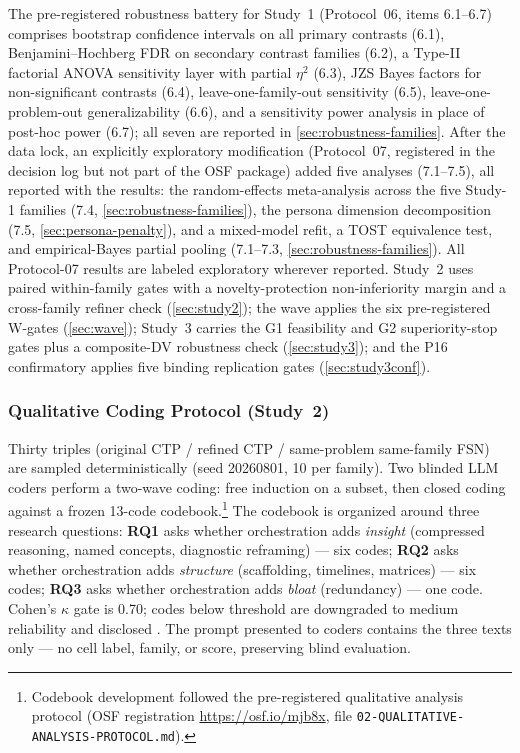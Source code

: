 \documentclass[12pt,a4paper]{article}
\begin{document}
The pre-registered robustness battery for Study~1 (Protocol~06,
items 6.1--6.7) comprises
bootstrap confidence intervals on all primary contrasts (6.1),
Benjamini--Hochberg FDR on secondary contrast families (6.2), a Type-II
factorial ANOVA sensitivity layer with partial $\eta^2$ (6.3), JZS Bayes
factors for non-significant contrasts (6.4), leave-one-family-out
sensitivity (6.5), leave-one-problem-out generalizability (6.6), and a
sensitivity power analysis in place of post-hoc power (6.7); all seven are
reported in \cref{sec:robustness-families}. After the data
lock, an explicitly exploratory modification (Protocol~07, registered in the
decision log but not part of the OSF package) added five analyses
(7.1--7.5), all reported with the results: the random-effects meta-analysis
across the five Study-1 families (7.4, \cref{sec:robustness-families}), the
persona dimension decomposition (7.5, \cref{sec:persona-penalty}), and a
mixed-model refit, a TOST equivalence test, and empirical-Bayes partial
pooling (7.1--7.3, \cref{sec:robustness-families}). All Protocol-07 results
are labeled exploratory wherever reported. Study~2 uses paired within-family
gates with a novelty-protection non-inferiority margin and a cross-family
refiner check (\cref{sec:study2}); the wave applies the six pre-registered
W-gates (\cref{sec:wave}); Study~3 carries the G1 feasibility and G2
superiority-stop gates plus a composite-DV robustness check
(\cref{sec:study3}); and the P16 confirmatory applies five binding
replication gates (\cref{sec:study3conf}).

\subsubsection{Qualitative Coding Protocol (Study~2)}\label{sec:qual-coding}

Thirty triples (original CTP / refined CTP / same-problem same-family FSN) are
sampled deterministically (seed 20260801, 10 per family). Two blinded LLM coders
perform a two-wave coding: free induction on a subset, then closed coding
against a frozen 13-code codebook.\footnote{Codebook development followed the
pre-registered qualitative analysis protocol (OSF registration
\url{https://osf.io/mjb8x}, file \texttt{02-QUALITATIVE-ANALYSIS-PROTOCOL.md}).} The codebook is organized
around three research questions: \textbf{RQ1} asks whether orchestration adds
\emph{insight} (compressed reasoning, named concepts, diagnostic reframing) ---
six codes; \textbf{RQ2} asks whether orchestration adds \emph{structure}
(scaffolding, timelines, matrices) --- six codes; \textbf{RQ3} asks whether
orchestration adds \emph{bloat} (redundancy) --- one code. Cohen's $\kappa$ gate is 0.70; codes below threshold
are downgraded to medium reliability and disclosed \citep{Cohen1960}. The prompt
presented to coders contains the three texts only --- no cell label, family, or
score, preserving blind evaluation.
\end{document}
